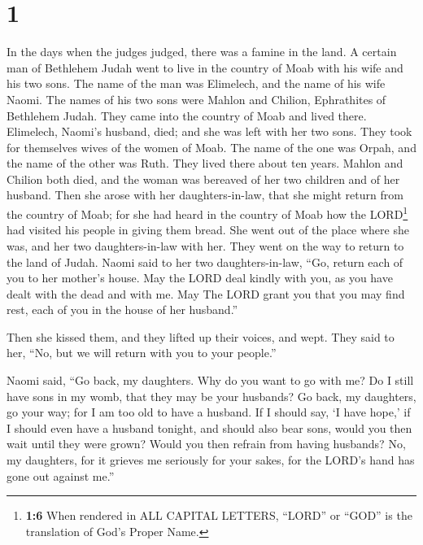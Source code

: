 \hypertarget{section}{%
\section{1}\label{section}}

 In the days when the judges judged, there was a famine in
the land. A certain man of Bethlehem Judah went to live in the country
of Moab with his wife and his two sons.  The name of the
man was Elimelech, and the name of his wife Naomi. The names of his two
sons were Mahlon and Chilion, Ephrathites of Bethlehem Judah. They came
into the country of Moab and lived there.  Elimelech,
Naomi's husband, died; and she was left with her two sons.
 They took for themselves wives of the women of Moab. The
name of the one was Orpah, and the name of the other was Ruth. They
lived there about ten years.  Mahlon and Chilion both
died, and the woman was bereaved of her two children and of her husband.
 Then she arose with her daughters-in-law, that she might
return from the country of Moab; for she had heard in the country of
Moab how the LORD\footnote{\textbf{1:6} When rendered in ALL CAPITAL
  LETTERS, ``LORD'' or ``GOD'' is the translation of God's Proper Name.}
had visited his people in giving them bread.  She went out
of the place where she was, and her two daughters-in-law with her. They
went on the way to return to the land of Judah.  Naomi
said to her two daughters-in-law, ``Go, return each of you to her
mother's house. May the LORD deal kindly with you, as you have dealt
with the dead and with me.  May The LORD grant you that
you may find rest, each of you in the house of her husband.''

Then she kissed them, and they lifted up their voices, and wept.
 They said to her, ``No, but we will return with you to
your people.''

 Naomi said, ``Go back, my daughters. Why do you want to
go with me? Do I still have sons in my womb, that they may be your
husbands?  Go back, my daughters, go your way; for I am
too old to have a husband. If I should say, `I have hope,' if I should
even have a husband tonight, and should also bear sons, 
would you then wait until they were grown? Would you then refrain from
having husbands? No, my daughters, for it grieves me seriously for your
sakes, for the LORD's hand has gone out against me.''

